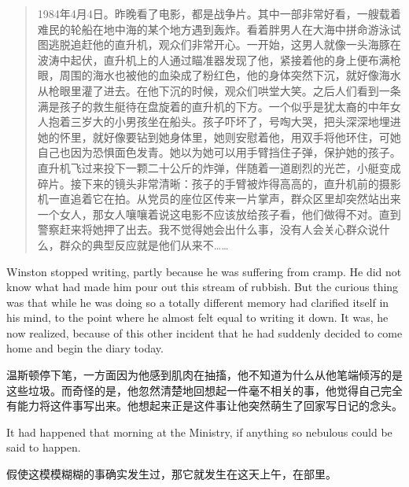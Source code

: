 \begin{paracol}{2}
\switchcolumn

\begin{quotation}
1984年4月4日。昨晚看了电影，都是战争片。其中一部非常好看，一艘载着难民的轮船在地中海的某个地方遇到轰炸。看着胖男人在大海中拼命游泳试图逃脱追赶他的直升机，观众们非常开心。一开始，这男人就像一头海豚在波涛中起伏，直升机上的人通过瞄准器发现了他，紧接着他的身上便布满枪眼，周围的海水也被他的血染成了粉红色，他的身体突然下沉，就好像海水从枪眼里灌了进去。在他下沉的时候，观众们哄堂大笑。之后人们看到一条满是孩子的救生艇待在盘旋着的直升机的下方。一个似乎是犹太裔的中年女人抱着三岁大的小男孩坐在船头。孩子吓坏了，号啕大哭，把头深深地埋进她的怀里，就好像要钻到她身体里，她则安慰着他，用双手将他环住，可她自己也因为恐惧面色发青。她以为她可以用手臂挡住子弹，保护她的孩子。直升机飞过来投下一颗二十公斤的炸弹，伴随着一道剧烈的光芒，小艇变成碎片。接下来的镜头非常清晰：孩子的手臂被炸得高高的，直升机前的摄影机一直追着它在拍。从党员的座位区传来一片掌声，群众区里却突然站出来一个女人，那女人嚷嚷着说这电影不应该放给孩子看，他们做得不对。直到警察赶来将她押了出去。我不觉得她会出什么事，没有人会关心群众说什么，群众的典型反应就是他们从来不\ldots\ldots{}
\end{quotation}

\switchcolumn*

Winston stopped writing, partly because he was suffering from cramp. He
did not know what had made him pour out this stream of rubbish. But the
curious thing was that while he was doing so a totally different memory
had clarified itself in his mind, to the point where he almost felt
equal to writing it down. It was, he now realized, because of this other
incident that he had suddenly decided to come home and begin the diary
today.

\switchcolumn

温斯顿停下笔，一方面因为他感到肌肉在抽搐，他不知道为什么从他笔端倾泻的是这些垃圾。而奇怪的是，他忽然清楚地回想起一件毫不相关的事，他觉得自己完全有能力将这件事写出来。他想起来正是这件事让他突然萌生了回家写日记的念头。

\switchcolumn*

It had happened that morning at the Ministry, if anything so nebulous
could be said to happen.

\switchcolumn

假使这模模糊糊的事确实发生过，那它就发生在这天上午，在部里。

\switchcolumn*


\end{paracol}
